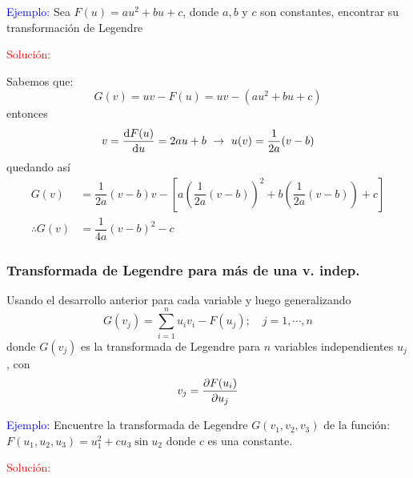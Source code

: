 \documentclass[../main]{subfiles}
\begin{document}
\textcolor{blue}{Ejemplo:} Sea $F(u)=au^2+bu+c$, donde $a, b$ y $c$ son constantes, encontrar su transformación de Legendre 

\textcolor{red}{Solución:}

Sabemos que:
\begin{equation*}
    G(v)=uv-F(u)=uv-(au^2+bu+c)
\end{equation*}
entonces 
\begin{equation*}
    v=\dv{F(u)}{u}=2au+b \ \rightarrow \ u(v)=\dfrac{1}{2a}(v-b)
\end{equation*}
quedando así 
\begin{equation*}
    \begin{split}
        G(v)&=\dfrac{1}{2a}(v-b)v-\left[a\left(\dfrac{1}{2a}(v-b)\right)^2+b\left(\dfrac{1}{2a}(v-b)\right)+c\right]\\
        \therefore G(v)&=\dfrac{1}{4a}(v-b)^2-c    
    \end{split}
\end{equation*}

\subsubsection{Transformada de Legendre para más de una v. indep.}
Usando el desarrollo anterior para cada variable y luego generalizando
\begin{equation}
    G(v_j)=\sum_{i=1}^n u_i v_i-F(u_j);\quad j=1, \cdots, n
\end{equation}
donde $G(v_j)$ es la transformada de Legendre para $n$ variables independientes $u_j$, con 
\begin{equation}
    v_j=\pdv{F(u_i)}{u_j}
\end{equation}

\textcolor{blue}{Ejemplo:} Encuentre la transformada de Legendre $G(v_1, v_2, v_3)$ de la función: $F(u_1, u_2, u_3)=u^2_1+cu_3\sin u_2$ donde $c$ es una constante.

\textcolor{red}{Solución:}
\end{document}
